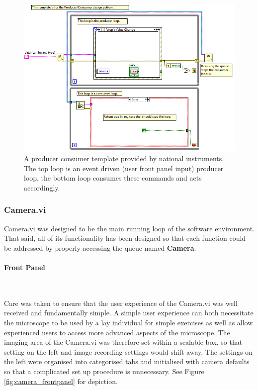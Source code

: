 \begin{figure}
\centering
\includegraphics[width=0.8\linewidth]{Figures/standard_pro_cons}
\caption[LabVIEW Producer Consumer Template]{A producer consumer template provided by national instruments.
The top loop is an event driven (user front panel input) producer loop, the bottom loop consumes these commands and acts accordingly.}
\label{fig:standard_pro_cons}
\end{figure}


\subsubsection{Camera.vi}

Camera.vi was designed to be the main running loop of the software environment.
That said, all of its functionality has been designed so that each function could be addressed by properly accessing the queue named \textbf{Camera}.

\paragraph{Front Panel}~

Care was taken to ensure that the user experience of the Camera.vi was well received and fundamentally simple.
A simple user experience can both necessitate the microscope to be used by a lay individual for simple exercises as well as allow experienced users to access more advanced aspects of the microscope.
The imaging area of the Camera.vi was therefore set within a scalable box, so that setting on the left and image recording settings would shift away.
The settings on the left were organised into categorised tabs and initialised with camera defaults so that a complicated set up procedure is unnecessary.
See Figure \ref{fig:camera_frontpanel} for depiction.

